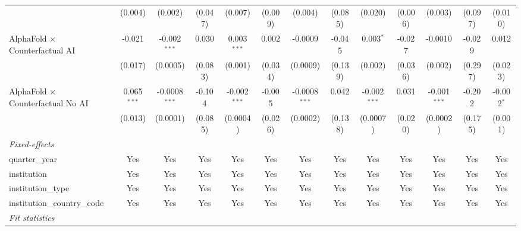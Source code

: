 \begin{tabular}{lcccccccccccc}
                                            & (0.004)       & (0.002)         & (0.047)       & (0.007)        & (0.009)       & (0.004)         & (0.085)     & (0.020)        & (0.006)       & (0.003)        & (0.097)       & (0.010)\\   
   AlphaFold $\times$ Counterfactual AI     & -0.021        & -0.002$^{***}$  & 0.030         & 0.003$^{***}$  & 0.002         & -0.0009         & -0.045      & 0.003$^{*}$    & -0.027        & -0.0010        & -0.029        & 0.012\\   
                                            & (0.017)       & (0.0005)        & (0.083)       & (0.001)        & (0.034)       & (0.0009)        & (0.139)     & (0.002)        & (0.036)       & (0.002)        & (0.297)       & (0.023)\\   
   AlphaFold $\times$ Counterfactual No AI  & 0.065$^{***}$ & -0.0008$^{***}$ & -0.104        & -0.002$^{***}$ & -0.005        & -0.0008$^{***}$ & 0.042       & -0.002$^{***}$ & 0.031         & -0.001$^{***}$ & -0.202        & -0.002$^{*}$\\   
                                            & (0.013)       & (0.0001)        & (0.085)       & (0.0004)       & (0.026)       & (0.0002)        & (0.138)     & (0.0007)       & (0.020)       & (0.0002)       & (0.175)       & (0.001)\\   
   \midrule
   \emph{Fixed-effects}\\
   quarter\_year                            & Yes           & Yes             & Yes           & Yes            & Yes           & Yes             & Yes         & Yes            & Yes           & Yes            & Yes           & Yes\\  
   institution                              & Yes           & Yes             & Yes           & Yes            & Yes           & Yes             & Yes         & Yes            & Yes           & Yes            & Yes           & Yes\\  
   institution\_type                        & Yes           & Yes             & Yes           & Yes            & Yes           & Yes             & Yes         & Yes            & Yes           & Yes            & Yes           & Yes\\  
   institution\_country\_code               & Yes           & Yes             & Yes           & Yes            & Yes           & Yes             & Yes         & Yes            & Yes           & Yes            & Yes           & Yes\\  
   \midrule
   \emph{Fit statistics}\\

\end{tabular}
